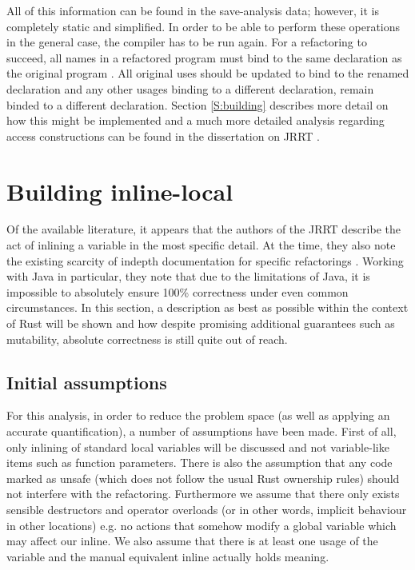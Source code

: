 All of this information can be found in the save-analysis data; however, it is completely static and simplified. In order to be able to perform these operations in the general case, the compiler has to be run again. For a refactoring to succeed, all names in a refactored program must bind to the same declaration as the original program \cite{schafer2010specification}. All original uses should be updated to bind to the renamed declaration and any other usages binding to a different declaration, remain binded to a different declaration. Section \ref{S:building} describes more detail on how this might be implemented and a much more detailed analysis regarding access constructions can be found in the dissertation on JRRT \cite{schafer2010specification}.

\section{Building inline-local}\label{S:buildIL}
Of the available literature, it appears that the authors of the JRRT describe the act of inlining a variable in the most specific detail. At the time, they also note the existing scarcity of indepth documentation for specific refactorings \cite{schafer2010specification}. Working with Java in particular, they note that due to the limitations of Java, it is impossible to absolutely ensure 100\% correctness under even common circumstances. In this section, a description as best as possible within the context of Rust will be shown and how despite promising additional guarantees such as mutability, absolute correctness is still quite out of reach.

\subsection{Initial assumptions}
For this analysis, in order to reduce the problem space (as well as applying an accurate quantification), a number of assumptions have been made. First of all, only inlining of standard local variables will be discussed and not variable-like items such as function parameters. There is also the assumption that any code marked as unsafe (which does not follow the usual Rust ownership rules) should not interfere with the refactoring. Furthermore we assume that there only exists sensible destructors and operator overloads (or in other words, implicit behaviour in other locations) e.g. no actions that somehow modify a global variable which may affect our inline. We also assume that there is at least one usage of the variable and the manual equivalent inline actually holds meaning.

